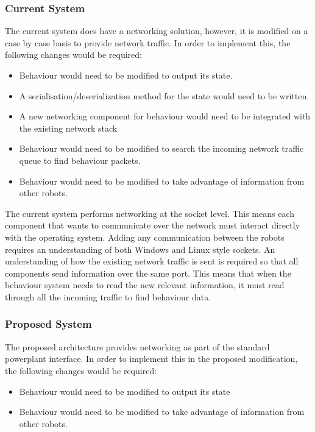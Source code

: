 \documentclass[english,12pt]{scrartcl}
\begin{document}
			\subsubsection{Current System}
				The current system does have a networking solution, however, it is modified on a case by case basis to provide network traffic.
				In order to implement this, the following changes would be required:
				\begin{itemize}
					\item Behaviour would need to be modified to output its state.
					\item A serialisation/deserialization method for the state would need to be written.
					\item A new networking component for behaviour would need to be integrated with the existing network stack
					\item Behaviour would need to be modified to search the incoming network traffic queue to find behaviour packets.
					\item Behaviour would need to be modified to take advantage of information from other robots.
				\end{itemize}

				The current system performs networking at the socket level.
				This means each component that wants to communicate over the network must interact directly with the operating system.
				Adding any communication between the robots requires an understanding of both Windows and Linux style sockets.
				An understanding of how the existing network traffic is sent is required so that all components send information over the same port.
				This means that when the behaviour system needs to read the new relevant information, it must read through all the incoming traffic to find behaviour data.

			\subsubsection{Proposed System}
				The proposed architecture provides networking as part of the standard \gls{powerplant} interface.
				In order to implement this in the proposed modification, the following changes would be required:
				\begin{itemize}
					\item Behaviour would need to be modified to output its state
					\item Behaviour would need to be modified to take advantage of information from other robots.
				\end{itemize}
\end{document}
